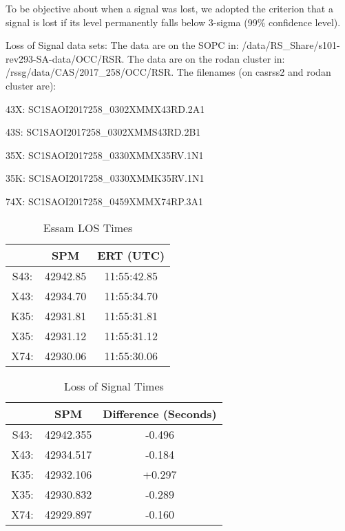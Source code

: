 \documentclass[crop=false,class=article,oneside]{standalone}
\begin{document}
To be objective about when a signal was lost, we adopted the criterion that a signal is lost if its level permanently falls below 3-sigma (99\% confidence level).
\par
Loss of Signal data sets:
The data are on the SOPC in:
/data/RS\_Share/s101-rev293-SA-data/OCC/RSR. The data are on the rodan cluster in: /rssg/data/CAS/2017\_258/OCC/RSR. The filenames (on casrss2 and rodan cluster are):
\begin{itemize}
\begin{multicols}{2}
    \item 43X: SC1SAOI2017258\_0302XMMX43RD.2A1
    \item 43S: SC1SAOI2017258\_0302XMMS43RD.2B1
    \item 35X: SC1SAOI2017258\_0330XMMX35RV.1N1
    \item 35K: SC1SAOI2017258\_0330XMMK35RV.1N1
    \item 74X: SC1SAOI2017258\_0459XMMX74RP.3A1
\end{multicols}
\end{itemize}
\begin{table}[H]
    \centering
    \caption{Essam LOS Times}
    \begin{tabular}{c c c} 
        \hline
         & SPM      & ERT (UTC)    \\ 
        \hline
        S43: & 42942.85 & 11:55:42.85  \\
        X43: & 42934.70 & 11:55:34.70  \\
        K35: & 42931.81 & 11:55:31.81  \\
        X35: & 42931.12 & 11:55:31.12  \\
        X74: & 42930.06 & 11:55:30.06  \\
        \hline
    \end{tabular}
\end{table}
\begin{table}[H]
    \centering
    \caption{Loss of Signal Times}
    \begin{tabular}{c c c} 
        \hline
        & SPM      & Difference (Seconds)    \\ 
        \hline
        S43: & 42942.355 & -0.496    \\
        X43: & 42934.517 & -0.184    \\
        K35: & 42932.106 & +0.297    \\
        X35: & 42930.832 & -0.289    \\
        X74: & 42929.897 & -0.160    \\
        \hline
    \end{tabular}
\end{table}
\end{document}
